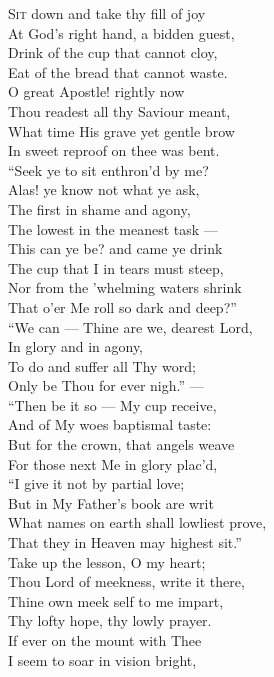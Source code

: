 \textsc{Sit} down and take thy fill of joy \\
 At God’s right hand, a bidden guest, \\
 Drink of the cup that cannot cloy, \\
 Eat of the bread that cannot waste. \\
 O great Apostle! rightly now \\
 Thou readest all thy Saviour meant, \\
 What time His grave yet gentle brow \\
 In sweet reproof on thee was bent. \\
  “Seek ye to sit enthron’d by me? \\
 Alas! ye know not what ye ask, \\
 The first in shame and agony, \\
 The lowest in the meanest task — \\
 This can ye be? and came ye drink \\
 The cup that I in tears must steep, \\
 Nor from the ’whelming waters shrink \\
 That o’er Me roll so dark and deep?” \\
  “We can — Thine are we, dearest Lord, \\
 In glory and in agony, \\
 To do and suffer all Thy word; \\
 Only be Thou for ever nigh.” — \\
 “Then be it so — My cup receive, \\
 And of My woes baptismal taste: \\
 But for the crown, that angels weave \\
 For those next Me in glory plac’d, \\
  “I give it not by partial love; \\
 But in My Father’s book are writ \\
 What names on earth shall lowliest prove, \\
 That they in Heaven may highest sit.” \\
 Take up the lesson, O my heart; \\
 Thou Lord of meekness, write it there, \\
 Thine own meek self to me impart, \\
 Thy lofty hope, thy lowly prayer. \\
  If ever on the mount with Thee \\
 I seem to soar in vision bright, \\

